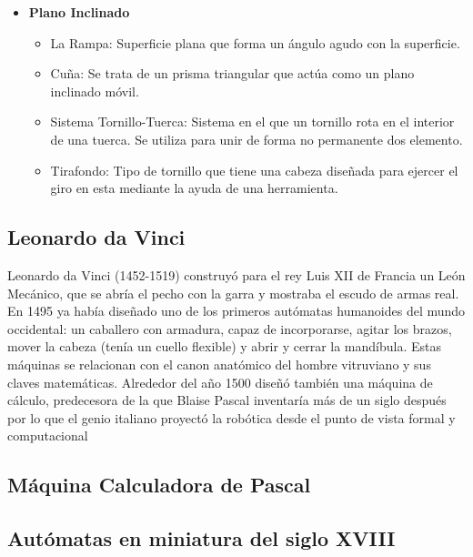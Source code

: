 \documentclass[paper=a4, fontsize=11pt]{scrartcl}
\begin{document}
\begin{itemize}
\begin{itemize}
\end{itemize}

\item \textbf{Plano Inclinado}

\begin{itemize}
\item La Rampa: Superficie plana que forma un ángulo agudo con la superficie.

\item Cuña: Se trata de un prisma triangular que actúa como un plano inclinado móvil.

\item Sistema Tornillo-Tuerca: Sistema en el que un tornillo rota en el interior de una tuerca. Se utiliza para unir de forma no permanente dos elemento.

\item Tirafondo: Tipo de tornillo que tiene una cabeza diseñada para ejercer el giro en esta mediante la ayuda de una herramienta.

\end{itemize}

\end{itemize}

\subsection{Leonardo da Vinci}

Leonardo da Vinci (1452-1519) construyó para el rey Luis XII de Francia un León Mecánico, que se abría el pecho con la garra y mostraba el escudo de armas real. En 1495 ya había diseñado uno de los primeros autómatas humanoides del mundo occidental: un caballero con armadura, capaz de incorporarse, agitar los brazos, mover la cabeza (tenía un cuello flexible) y abrir y cerrar la mandíbula. Estas máquinas se relacionan con el canon anatómico del hombre vitruviano y sus claves matemáticas. Alrededor del año 1500 diseñó también una máquina de cálculo, predecesora de la que Blaise Pascal inventaría más de un siglo después por lo que el genio italiano proyectó la robótica desde el punto de vista formal y computacional

\subsection{Máquina Calculadora de Pascal}

\subsection{Autómatas en miniatura del siglo XVIII}
\end{document}
